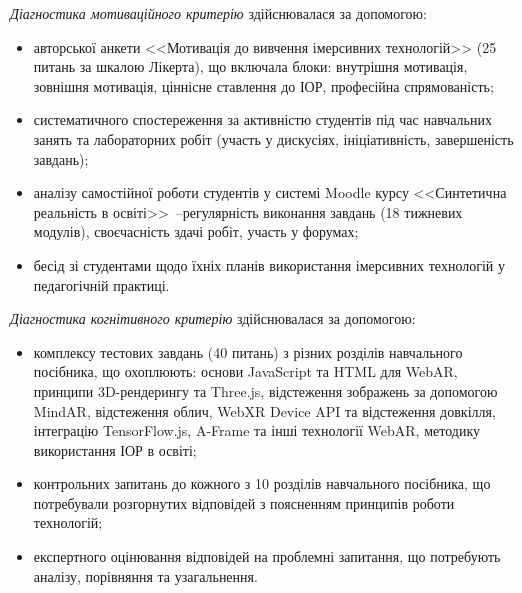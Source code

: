 \textit{Діагностика мотиваційного критерію} здійснювалася за допомогою:
\begin{itemize}
\item авторської анкети <<Мотивація до вивчення імерсивних технологій>> (25 питань за шкалою Лікерта), що включала блоки: внутрішня мотивація, зовнішня мотивація, ціннісне ставлення до ІОР, професійна спрямованість;
\item систематичного спостереження за активністю студентів під час навчальних занять та лабораторних робіт (участь у дискусіях, ініціативність, завершеність завдань);
\item аналізу самостійної роботи студентів у системі Moodle курсу <<Синтетична реальність в освіті>>~--регулярність виконання завдань (18 тижневих модулів), своєчасність здачі робіт, участь у форумах;
\item бесід зі студентами щодо їхніх планів використання імерсивних технологій у педагогічній практиці.
\end{itemize}

\textit{Діагностика когнітивного критерію} здійснювалася за допомогою:
\begin{itemize}
\item комплексу тестових завдань (40 питань) з різних розділів навчального посібника, що охоплюють: основи JavaScript та HTML для WebAR, принципи 3D-рендерингу та Three.js, відстеження зображень за допомогою MindAR, відстеження облич, WebXR Device API та відстеження довкілля, інтеграцію TensorFlow.js, A-Frame та інші технології WebAR, методику використання ІОР в освіті;
\item контрольних запитань до кожного з 10 розділів навчального посібника, що потребували розгорнутих відповідей з поясненням принципів роботи технологій;
\item експертного оцінювання відповідей на проблемні запитання, що потребують аналізу, порівняння та узагальнення.
\end{itemize}

